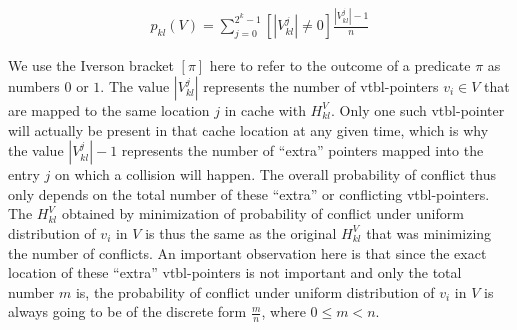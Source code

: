 \begin{eqnarray*}
p_{kl}(V)=\sum\limits_{j=0}^{2^k-1}[|V^j_{kl}| \neq 0]\frac{|V^j_{kl}|-1}{n}
\end{eqnarray*}

\noindent
We use the Iverson bracket $[\pi]$ here to refer to the outcome of a predicate $\pi$ as numbers $0$ or $1$.
The value $|V^j_{kl}|$ represents the number of vtbl-pointers $v_i \in V$ that are mapped to the same location $j$ in cache with $H_{kl}^V$. Only 
one such vtbl-pointer will actually be present in that cache location at any given 
time, which is why the value $|V^j_{kl}|-1$ represents the number of ``extra'' 
pointers mapped into the entry $j$ on which a collision will happen. The overall 
probability of conflict thus only depends on the total number of these ``extra'' 
or conflicting vtbl-pointers. The $H_{kl}^V$ obtained by minimization of 
probability of conflict under uniform distribution of $v_i$ in $V$ is thus the 
same as the original $H_{kl}^V$ that was minimizing the number of conflicts. An 
important observation here is that since the exact location of these ``extra'' 
vtbl-pointers is not important and only the total number $m$ is, the probability 
of conflict under uniform distribution of $v_i$ in $V$ is always going to be of 
the discrete form $\frac{m}{n}$, where $0 \le m < n$.




